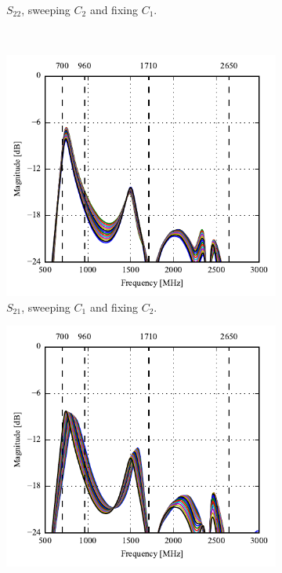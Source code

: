 \begin{figure}[htbp]
\begin{subfigure}[b]{0.49\linewidth}
        \caption{$S_{22}$, sweeping $C_2$ and fixing $C_1$.}
        \label{fig:ant1_proto_sim_s22}
    \end{subfigure}
~
    \begin{subfigure}[b]{0.49\linewidth}
        \centering
        \includegraphics{img/tech_sol/monopole/prototype_v2/sim_s12_s11}
        \caption{$S_{21}$, sweeping $C_1$ and fixing $C_2$.}
        \label{fig:ant1_proto_sim_s11_s12}
    \end{subfigure}
    \hfill
    \begin{subfigure}[b]{0.49\linewidth}
        \centering
        \includegraphics{img/tech_sol/monopole/prototype_v2/sim_s12_s22}

\end{subfigure}
\end{figure}
